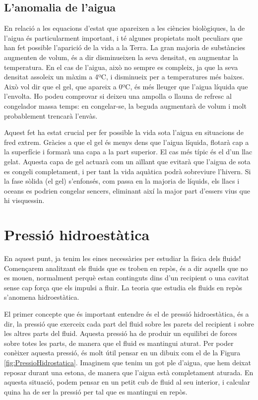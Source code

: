 \documentclass[12pt]{book}
\begin{document}
\subsection{L'anomalia de l'aigua}

En relació a les equacions d'estat que apareixen a les ciències biològiques, la de l'aigua és particularment important, i té algunes propietats molt peculiars que han fet possible l'aparició de la vida a la Terra. La gran majoria de substàncies augmenten de volum, és a dir disminueixen la seva densitat, en augmentar la temperatura. En el cas de l'aigua, això no sempre es compleix, ja que la seva densitat assoleix un màxim a 4ºC, i disminueix per a temperatures més baixes. Això vol dir que el gel, que apareix a 0ºC, és més lleuger que l'aigua líquida que l'envolta. Ho podeu comprovar si deixeu una ampolla o llauna de refresc al congelador massa temps: en congelar-se, la beguda augmentarà de volum i molt probablement trencarà l'envàs.

Aquest fet ha estat crucial per fer possible la vida sota l'aigua en situacions de fred extrem. Gràcies a que el gel és menys dens que l'aigua líquida, flotarà cap a la superfície i formarà una capa a la part superior. El cas més típic és el d'un llac gelat. Aquesta capa de gel actuarà com un aïllant que evitarà que l'aigua de sota es congeli completament, i per tant la vida aquàtica podrà sobreviure l'hivern. Si la fase sòlida (el gel) s'enfonsés, com passa en la majoria de líquids, els llacs i oceans es podrien congelar sencers, eliminant així la major part d'essers vius que hi visquessin. 

\section{Pressió hidroestàtica}

En aquest punt, ja tenim les eines necessàries per estudiar la física dels fluids! Començarem analitzant els fluids que es troben en repòs, és a dir aquells que no es mouen, normalment perquè estan continguts dins d'un recipient o una cavitat sense cap força que els impulsi a fluir. La teoria que estudia els fluids en repòs s'anomena hidroestàtica. 

El primer concepte que és important entendre és el de pressió hidroestàtica, és a dir, la pressió que exerceix cada part del fluid sobre les parets del recipient i sobre les altres parts del fluid. Aquesta pressió ha de produir un equilibri de forces sobre totes les parts, de manera que el fluid es mantingui aturat. Per poder conèixer aquesta pressió, és molt útil pensar en un dibuix com el de la Figura \ref{fig:PressioHidrostatica}. Imaginem que tenim un got ple d'aigua, que hem deixat reposar durant una estona, de manera que l'aigua està completament aturada. En aquesta situació, podem pensar en un petit cub de fluid al seu interior, i calcular quina ha de ser la pressió per tal que es mantingui en repòs. 
\end{document}
